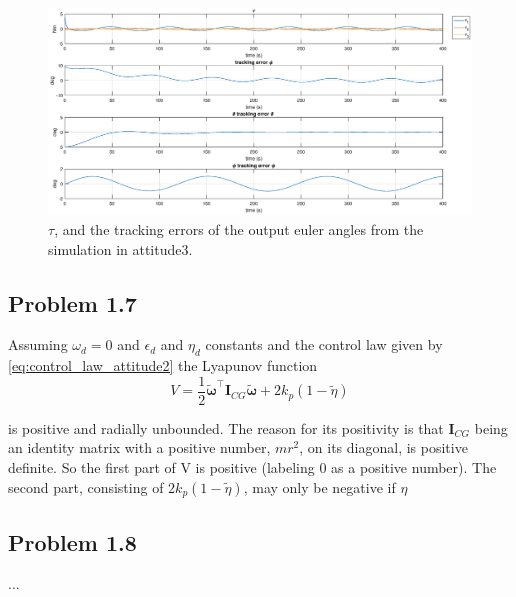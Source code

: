 \begin{figure}
	\centering
	\includegraphics[width=1.00\textwidth]{figures/3_tau_track.eps}
	\caption{ $\tau$, and the tracking errors of the output euler angles from the simulation in attitude3.}
\label{fig:sim_attitude3_track}
\end{figure}

\subsection*{Problem 1.7}
Assuming $\omega_d = 0$ and $\epsilon_d$ and $\eta_d$ constants and the control law given by \eqref{eq:control_law_attitude2} the Lyapunov function 
 \begin{equation}
	 V = \frac{1}{2} \tilde{\boldsymbol{\omega}}^{\top} \mathbf{I}_{CG}\tilde{\boldsymbol{\omega}} + 2 k_p (1-\tilde{\eta})
 \end{equation}
 
is positive and radially unbounded. The reason for its positivity is that $\mathbf{I}_{CG}$ being an identity matrix with a positive number, $mr^2$, on its diagonal, is positive definite. So the first part of V is positive (labeling 0 as a positive number). The second part, consisting of $2 k_p (1-\tilde{\eta})$, may only be negative if $\eta$

\subsection*{Problem 1.8}
...


